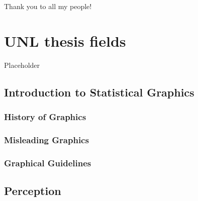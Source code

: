 \documentclass[print]{nuthesis}
\begin{document}
\begin{acknowledgments}
Thank you to all my people!
\end{acknowledgments}


\tableofcontents

\listoffigures
\listoftables

\mainmatter


\hypertarget{unl-thesis-fields}{%
\chapter{UNL thesis fields}\label{unl-thesis-fields}}

Placeholder

\hypertarget{introduction-to-statistical-graphics}{%
\section{Introduction to Statistical Graphics}\label{introduction-to-statistical-graphics}}

\hypertarget{history-of-graphics}{%
\subsection{History of Graphics}\label{history-of-graphics}}

\hypertarget{misleading-graphics}{%
\subsection{Misleading Graphics}\label{misleading-graphics}}

\hypertarget{graphical-guidelines}{%
\subsection{Graphical Guidelines}\label{graphical-guidelines}}

\hypertarget{perception}{%
\section{Perception}\label{perception}}
\end{document}
